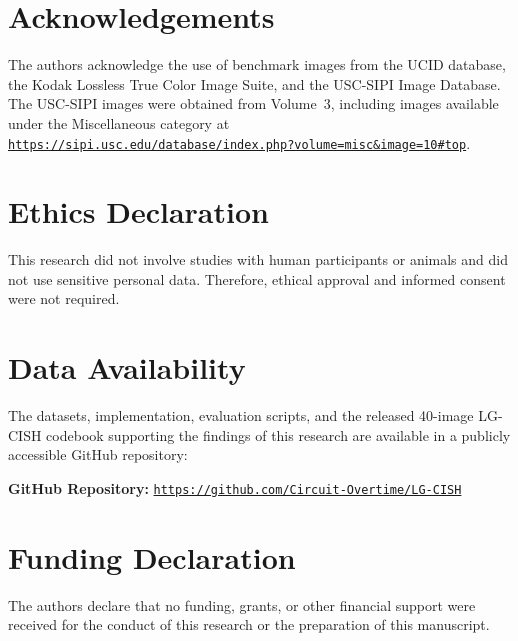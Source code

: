 \documentclass[11pt]{article}
\theoremstyle{definition}
\begin{document}
\section*{Acknowledgements}

The authors acknowledge the use of benchmark images from the UCID database, the Kodak Lossless True Color Image Suite, and the USC-SIPI Image Database. The USC-SIPI images were obtained from Volume~3, including images available under the Miscellaneous category at
\href{https://sipi.usc.edu/database/index.php?volume=misc\&image=10\#top}
{\texttt{https://sipi.usc.edu/database/index.php?volume=misc\&image=10\#top}}.

\section*{Ethics Declaration}

This research did not involve studies with human participants or animals and did not use sensitive personal data. Therefore, ethical approval and informed consent were not required.

\section*{Data Availability}

The datasets, implementation, evaluation scripts, and the released 40-image LG-CISH codebook supporting the findings of this research are available in a publicly accessible GitHub repository:

\noindent\textbf{GitHub Repository:}
\href{https://github.com/Circuit-Overtime/LG-CISH}
{\texttt{https://github.com/Circuit-Overtime/LG-CISH}}

\section*{Funding Declaration}

The authors declare that no funding, grants, or other financial support were received for the conduct of this research or the preparation of this manuscript.
\end{document}
